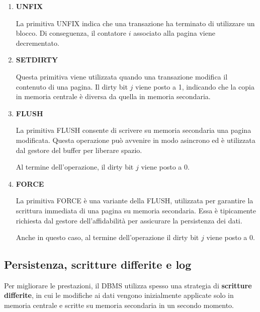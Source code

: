 \begin{enumerate}
\begin{itemize}
		\begin{itemize}
			\item \textbf{NO-STEAL}: la transazione viene sospesa finché non si libera una pagina;
			\item \textbf{STEAL}: il sistema può sottrarre una pagina a un'altra transazione, anche se ancora in uso.
		\end{itemize}
	\end{itemize}
	
	Dopo il caricamento del blocco, il contatore $i$ della pagina viene incrementato.
	
	\item \textbf{UNFIX}
	
	La primitiva UNFIX indica che una transazione ha terminato di utilizzare un blocco. 
	Di conseguenza, il contatore $i$ associato alla pagina viene decrementato.
	
	\item \textbf{SETDIRTY}
	
	Questa primitiva viene utilizzata quando una transazione modifica il contenuto di una pagina. 
	Il dirty bit $j$ viene posto a 1, indicando che la copia in memoria centrale è diversa da quella in memoria secondaria.
	
	\item \textbf{FLUSH}
	
	La primitiva FLUSH consente di scrivere su memoria secondaria una pagina modificata. 
	Questa operazione può avvenire in modo asincrono ed è utilizzata dal gestore del buffer per liberare spazio.
	
	Al termine dell'operazione, il dirty bit $j$ viene posto a 0.
	
	\item \textbf{FORCE}
	
	La primitiva FORCE è una variante della FLUSH, utilizzata per garantire la scrittura immediata di una pagina su memoria secondaria. 
	Essa è tipicamente richiesta dal gestore dell'affidabilità per assicurare la persistenza dei dati.
	
	Anche in questo caso, al termine dell'operazione il dirty bit $j$ viene posto a 0.
\end{enumerate}
\subsection{Persistenza, scritture differite e log}

Per migliorare le prestazioni, il DBMS utilizza spesso una strategia di \textbf{scritture differite}, in cui le modifiche ai dati vengono inizialmente applicate solo in memoria centrale e scritte su memoria secondaria in un secondo momento.

